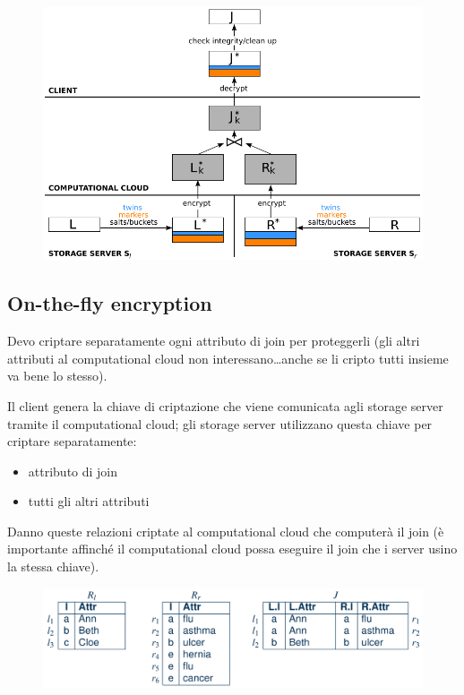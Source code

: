 \documentclass{report}
\begin{document}
\begin{figure}[H]
    \centering
    \includegraphics[width=1\linewidth]{images/join.png}
\end{figure}

\subsection{On-the-fly encryption}
Devo criptare separatamente ogni attributo di join per proteggerli (gli altri attributi 
al computational cloud non interessano\dots anche se li cripto tutti insieme va bene lo stesso).

\noindent Il client genera la chiave di criptazione che viene comunicata agli storage server tramite il 
computational cloud; gli storage server utilizzano questa chiave per criptare separatamente:
\begin{itemize}
    \item attributo di join 
    \item tutti gli altri attributi 
\end{itemize}

\noindent Danno queste relazioni criptate al computational cloud che computerà il join 
(è importante affinché il computational cloud possa eseguire il join che i server usino la stessa chiave).

\begin{figure}[H]
    \centering
    \includegraphics[width=1\linewidth]{images/otf1.png}
\end{figure}
\end{document}
